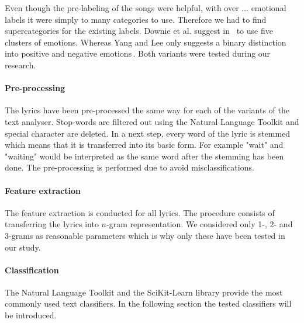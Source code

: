 \documentclass[a4paper,12pt]{article}
\begin{document}
Even though the pre-labeling of the songs were helpful, with over ... emotional labels it were simply to many categories to use. Therefore we had to find supercategories for the existing labels. Downie et al. suggest in \,\cite{downie20082007}  to use five clusters of emotions. Whereas Yang and Lee only suggests a binary distinction into positive and negative emotions\,\cite{yang2009music}. Both variants were tested during our research.

\paragraph{Pre-processing} The lyrics have been pre-processed the same way for each of the variants of the text analyser. Stop-words are filtered out using the Natural Language Toolkit and special character are deleted. In a next step, every word of the lyric is stemmed which means that it is transferred into its basic form. For example "wait" and "waiting" would be interpreted as the same word after the stemming has been done. The pre-processing is performed due to avoid misclassifications. 

\paragraph{Feature extraction} The feature extraction is conducted for all lyrics. The procedure consists of transferring the lyrics into $n$-gram representation. We considered only 1-, 2- and 3-grams as reasonable parameters which is why only these have been tested in our study. 

\paragraph{Classification} The Natural Language Toolkit and the SciKit-Learn library provide the most commonly used text classifiers. In the following section the tested classifiers will be introduced. 
\end{document}
